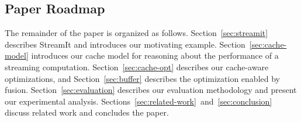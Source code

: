 \subsection{Paper Roadmap}

The remainder of the paper is organized as follows. Section~\ref{sec:streamit}
describes StreamIt and introduces our motivating example.
Section~\ref{sec:cache-model} introduces our cache model for 
reasoning about the performance of a streaming
computation. Section~\ref{sec:cache-opt} describes our cache-aware
optimizations, and Section~\ref{sec:buffer} describes the 
optimization enabled by fusion. Section~\ref{sec:evaluation} describes
our evaluation methodology and present our experimental
analysis. Sections~\ref{sec:related-work}~and~\ref{sec:conclusion}
discuss related work and concludes the paper.
